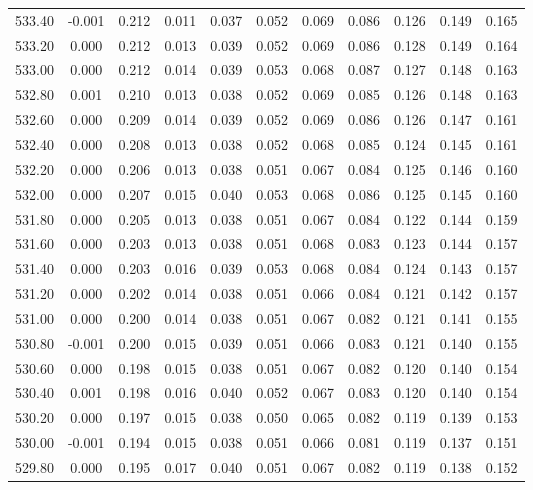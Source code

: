 \begin{longtable}{cccccccccc}
    533.40 & -0.001 &  0.212 &  0.011 &  0.037 &  0.052 &  0.069 &  0.086 &  0.126 &  0.149 &  0.165 \\
    533.20 &  0.000 &  0.212 &  0.013 &  0.039 &  0.052 &  0.069 &  0.086 &  0.128 &  0.149 &  0.164 \\
    533.00 &  0.000 &  0.212 &  0.014 &  0.039 &  0.053 &  0.068 &  0.087 &  0.127 &  0.148 &  0.163 \\
    532.80 &  0.001 &  0.210 &  0.013 &  0.038 &  0.052 &  0.069 &  0.085 &  0.126 &  0.148 &  0.163 \\
    532.60 &  0.000 &  0.209 &  0.014 &  0.039 &  0.052 &  0.069 &  0.086 &  0.126 &  0.147 &  0.161 \\
    532.40 &  0.000 &  0.208 &  0.013 &  0.038 &  0.052 &  0.068 &  0.085 &  0.124 &  0.145 &  0.161 \\
    532.20 &  0.000 &  0.206 &  0.013 &  0.038 &  0.051 &  0.067 &  0.084 &  0.125 &  0.146 &  0.160 \\
    532.00 &  0.000 &  0.207 &  0.015 &  0.040 &  0.053 &  0.068 &  0.086 &  0.125 &  0.145 &  0.160 \\
    531.80 &  0.000 &  0.205 &  0.013 &  0.038 &  0.051 &  0.067 &  0.084 &  0.122 &  0.144 &  0.159 \\
    531.60 &  0.000 &  0.203 &  0.013 &  0.038 &  0.051 &  0.068 &  0.083 &  0.123 &  0.144 &  0.157 \\
    531.40 &  0.000 &  0.203 &  0.016 &  0.039 &  0.053 &  0.068 &  0.084 &  0.124 &  0.143 &  0.157 \\
    531.20 &  0.000 &  0.202 &  0.014 &  0.038 &  0.051 &  0.066 &  0.084 &  0.121 &  0.142 &  0.157 \\
    531.00 &  0.000 &  0.200 &  0.014 &  0.038 &  0.051 &  0.067 &  0.082 &  0.121 &  0.141 &  0.155 \\
    530.80 & -0.001 &  0.200 &  0.015 &  0.039 &  0.051 &  0.066 &  0.083 &  0.121 &  0.140 &  0.155 \\
    530.60 &  0.000 &  0.198 &  0.015 &  0.038 &  0.051 &  0.067 &  0.082 &  0.120 &  0.140 &  0.154 \\
    530.40 &  0.001 &  0.198 &  0.016 &  0.040 &  0.052 &  0.067 &  0.083 &  0.120 &  0.140 &  0.154 \\
    530.20 &  0.000 &  0.197 &  0.015 &  0.038 &  0.050 &  0.065 &  0.082 &  0.119 &  0.139 &  0.153 \\
    530.00 & -0.001 &  0.194 &  0.015 &  0.038 &  0.051 &  0.066 &  0.081 &  0.119 &  0.137 &  0.151 \\
    529.80 &  0.000 &  0.195 &  0.017 &  0.040 &  0.051 &  0.067 &  0.082 &  0.119 &  0.138 &  0.152 \\

\end{longtable}
